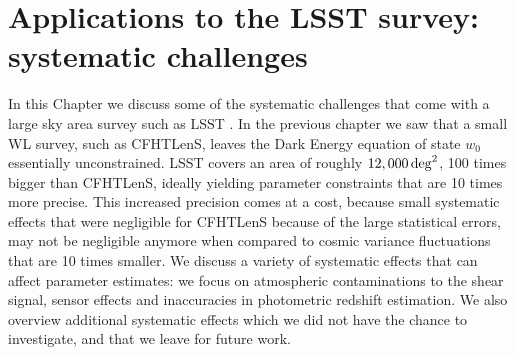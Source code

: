 
\chapter{Applications to the LSST survey: systematic challenges}
\lhead[\fancyplain{}{\thepage}]{\fancyplain{}{\rightmark}}
 \thispagestyle{plain}
\setlength{\parindent}{10mm}
\label{chp:7}

In this Chapter we discuss some of the systematic challenges that come with a large sky area survey such as LSST \citep{LSST}. In the previous chapter we saw that a small WL survey, such as CFHTLenS, leaves the Dark Energy equation of state $w_0$ essentially unconstrained. LSST covers an area of roughly $12,000\,{\rm deg}^2$, 100 times bigger than CFHTLenS, ideally yielding parameter constraints that are 10 times more precise. This increased precision comes at a cost, because small systematic effects that were negligible for CFHTLenS because of the large statistical errors, may not be negligible anymore when compared to cosmic variance fluctuations that are 10 times smaller. We discuss a variety of systematic effects that can affect parameter estimates: we focus on atmospheric contaminations to the shear signal, sensor effects and inaccuracies in photometric redshift estimation. We also overview additional systematic effects which we did not have the chance to investigate, and that we leave for future work.    

